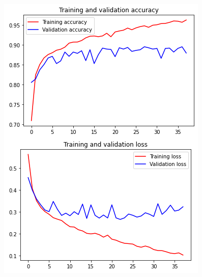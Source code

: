 \documentclass[11pt,a4paper,oneside]{article}
\begin{document}
\begin{figure}[h]
\centering
	\begin{minipage}[c]{.4\textwidth}
		\centering\setlength{\captionmargin}{0pt}%
		\includegraphics[width=.9\textwidth]{images/Task 3/VGG16 3.1/FT/Accuracy}
	\end{minipage}	
	\hspace{5mm}%
	\begin{minipage}[c]{.4\textwidth}
		\centering\setlength{\captionmargin}{0pt}%

\end{minipage}
\end{figure}
\end{document}
